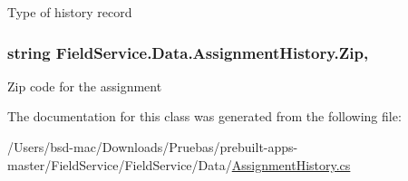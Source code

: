 Type of history record 

\hypertarget{class_field_service_1_1_data_1_1_assignment_history_a634f6264e5bc1fbb9d9f59ec7785934e}{
\subsubsection[{Zip}]{\setlength{\rightskip}{0pt plus 5cm}string Field\+Service.\+Data.\+Assignment\+History.\+Zip\hspace{0.3cm}{\ttfamily [get]}, {\ttfamily [set]}}}\label{class_field_service_1_1_data_1_1_assignment_history_a634f6264e5bc1fbb9d9f59ec7785934e}


Zip code for the assignment 



The documentation for this class was generated from the following file\+:\begin{DoxyCompactItemize}
\item 
/\+Users/bsd-\/mac/\+Downloads/\+Pruebas/prebuilt-\/apps-\/master/\+Field\+Service/\+Field\+Service/\+Data/\hyperlink{_assignment_history_8cs}{Assignment\+History.\+cs}\end{DoxyCompactItemize}
